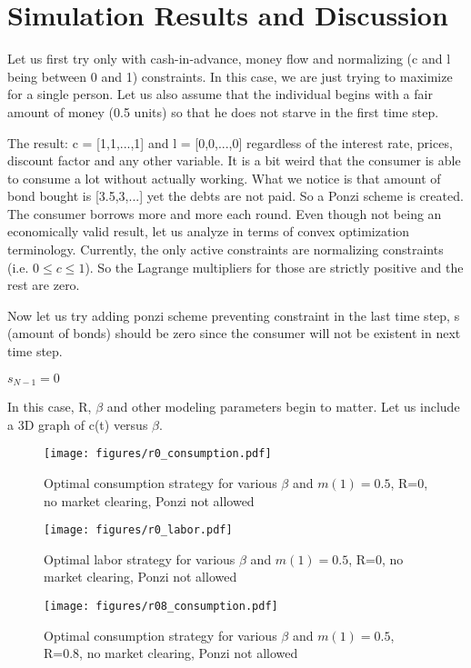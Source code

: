 \section*{Simulation Results and Discussion}\label{ch:ch5label}

Let us first try only with cash-in-advance, money flow and normalizing (c and l being between 0 and 1) constraints. In this case, we are just trying to maximize for a single person. Let us also assume that the individual begins with a fair amount of money (0.5 units) so that he does not starve in the first time step.

The result: c = [1,1,...,1] and l = [0,0,...,0] regardless of the interest rate, prices, discount factor and any other variable. It is a bit weird that the consumer is able to consume a lot without actually working. What we notice is that amount of bond bought is [3.5,3,...] yet the debts are not paid. So a Ponzi scheme is created. The consumer borrows more and more each round. Even though not being an economically valid result, let us analyze in terms of convex optimization terminology. Currently, the only active constraints are normalizing constraints (i.e. $0 \leq c \leq 1$). So the Lagrange multipliers for those are strictly positive and the rest are zero.

Now let us try adding ponzi scheme preventing constraint in the last time step, s (amount of bonds) should be zero since the consumer will not be existent in next time step.

$s_{N-1} = 0$ 

In this case, R, $\beta$ and other modeling parameters begin to matter. Let us include a 3D graph of c(t) versus $\beta$.

\begin{figure}
\caption{Optimal consumption strategy for various $\beta$ and $m(1)=0.5$, R=0, no market clearing, Ponzi not allowed}
\centering
\texttt{[image: figures/r0\_consumption.pdf]}
\end{figure}


\begin{figure}
\caption{Optimal labor strategy for various $\beta$ and $m(1)=0.5$, R=0, no market clearing, Ponzi not allowed}
\centering
\texttt{[image: figures/r0\_labor.pdf]}
\end{figure}


\begin{figure}
\caption{Optimal consumption strategy for various $\beta$ and $m(1)=0.5$, R=0.8, no market clearing, Ponzi not allowed}
\centering
\texttt{[image: figures/r08\_consumption.pdf]}
\end{figure}


